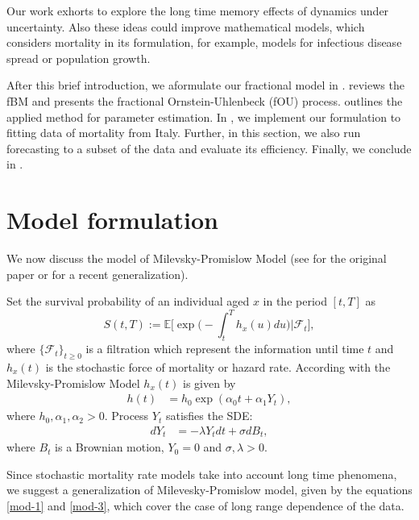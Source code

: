 \documentclass[smallextended]{svjour3}
\newcommand{\E}{\mathbb{E}}
\begin{document}
       
		 Our work exhorts to explore the long time memory effects of dynamics 
	 under uncertainty. Also these ideas could improve mathematical models, 
	 which considers mortality in its formulation, for example, models for 
	 infectious  disease spread or population growth.
	    

        After this brief introduction, we aformulate our fractional model in 
    .  reviews the fBM and presents
    the fractional Ornstein-Uhlenbeck (fOU) process.  outlines the
    applied method for parameter estimation. In  , we implement our
    formulation to fitting data of mortality from Italy. Further, in
    this section, we also run forecasting to a subset of the data and evaluate
    its efficiency. Finally, we conclude in .

	\section{Model formulation}\label{model-form}


	We now discuss the model of Milevsky-Promislow Model 
	(see \cite{mi-pr} for the original paper or \cite{gi-or-be}
	for a recent generalization). 

	Set the survival probability of an individual aged $x$ in the period 
	$[t,T]$ as
	\begin{equation}\label{E-surv}
		 S(t,T):=
			 \E
			 \Big[
				 \exp\Big(
					 -\int_t^T h_x(u) du
					 \Big)
				\Big|\mathcal{F}_t 
			\Big],
	\end{equation}
	where $\{\mathcal{F}_t\}_{t\ge 0} $ is a filtration which represent the 
	information 
	until time $t$ and $h_x(t)$ is the stochastic force of mortality or hazard 
	rate.
	According with the Milevsky-Promislow Model $h_x(t)$ is given by
	\begin{align}
		 h(t)&=h_0\exp(\alpha_0t+\alpha_1Y_t),\label{mod-1}
	\end{align}
	where  $h_0, \alpha_1, \alpha_2> 0$.
	Process $Y_t$ satisfies the SDE:
	\begin{align}
		 dY_t&=-\lambda Y_tdt+\sigma dB_t, \label{mod-3}
	\end{align}
	where $B_t$ is a Brownian motion, $Y_0=0$ and $\sigma,\lambda> 0$.


	Since stochastic mortality rate models take into account long time 
	phenomena, we
	suggest a generalization of Milevesky-Promislow model, given by the 
	equations
	\eqref{mod-1} and \eqref{mod-3}, which cover the case of long range 
	dependence of
	the data.
\end{document}
